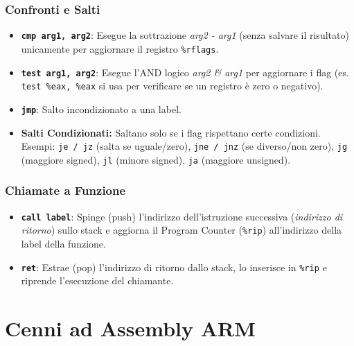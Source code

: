\documentclass[12pt, a4paper]{article}
\begin{document}
\subsubsection{Confronti e Salti}
\begin{itemize}
    \item \texttt{\textbf{cmp arg1, arg2}}: Esegue la sottrazione \textit{arg2 - arg1} (senza salvare il risultato) unicamente per aggiornare il registro \texttt{\%rflags}.
    \item \texttt{\textbf{test arg1, arg2}}: Esegue l'AND logico \textit{arg2 \& arg1} per aggiornare i flag (es. \texttt{test \%eax, \%eax} si usa per verificare se un registro è zero o negativo).
    \item \texttt{\textbf{jmp}}: Salto incondizionato a una label.
    \item \textbf{Salti Condizionati:} Saltano solo se i flag rispettano certe condizioni. Esempi: \texttt{je / jz} (salta se uguale/zero), \texttt{jne / jnz} (se diverso/non zero), \texttt{jg} (maggiore signed), \texttt{jl} (minore signed), \texttt{ja} (maggiore unsigned).
\end{itemize}

\subsubsection{Chiamate a Funzione}
\begin{itemize}
    \item \texttt{\textbf{call label}}: Spinge (push) l'indirizzo dell'istruzione successiva (\textit{indirizzo di ritorno}) sullo stack e aggiorna il Program Counter (\texttt{\%rip}) all'indirizzo della label della funzione.
    \item \texttt{\textbf{ret}}: Estrae (pop) l'indirizzo di ritorno dallo stack, lo inserisce in \texttt{\%rip} e riprende l'esecuzione del chiamante.
\end{itemize}


\section{Cenni ad Assembly ARM}
\end{document}
